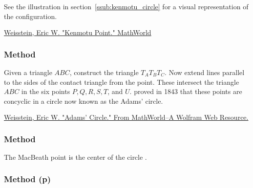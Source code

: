 \medskip

See  the illustration in section~\ref{ssub:kenmotu_circle} for a visual representation of the configuration.
\begin{flushright}
\small
\href{https://mathworld.wolfram.com/KenmotuPoint.html}{Weisstein, Eric W. "Kenmotu Point." MathWorld}
\end{flushright}

\subsubsection{Method }
\label{ssub:method_triangle_adams_points}
Given a triangle $ABC$, construct the  triangle $T_AT_BT_C$. Now extend lines parallel to the sides of the contact triangle from the  point. These intersect the triangle $ABC$ in the six points $P, Q,  R, S, T$, and $U$.  proved in 1843 that these points are concyclic in a circle now known as the Adams' circle.
\begin{flushright}
\small
\href{ https://mathworld.wolfram.com/AdamsCircle.html}{Weisstein, Eric W. "Adams' Circle." From MathWorld--A Wolfram Web Resource.}
\end{flushright}

\subsubsection{Method }
\label{ssub:method_triangle_macbeath_point}
The MacBeath point is the center of the circle .

\begin{tkzexample}[latex=.5\textwidth]
\end{tkzexample}

\subsubsection{Method (p)}
\label{ssub:method_triangle_poncelet_point}

